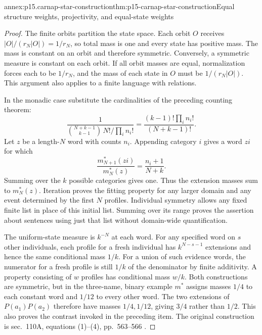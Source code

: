 \begin{annexitem}{annex:p15.carnap-star-construction}{thm:p15-carnap-star-construction}{Equal structure weights, projectivity, and equal-state weights}
\begin{proof}
The finite orbits partition the state space. Each orbit \(O\) receives
\(|O|/(r_N|O|)=1/r_N\), so total mass is one and every state has
positive mass. The mass is constant on an orbit and therefore symmetric.
Conversely, a symmetric measure is constant on each orbit. If all orbit
masses are equal, normalization forces each to be \(1/r_N\), and
the mass of each state in \(O\) must be \(1/(r_N|O|)\).
This argument also applies to a finite language with relations.

In the monadic case substitute the cardinalities of the preceding
counting theorem:
\[
 \frac1{\binom{N+k-1}{k-1}\,N!/\prod_i n_i!}
 =\frac{(k-1)!\prod_i n_i!}{(N+k-1)!}.
\]
Let \(z\) be a length-\(N\) word with counts \(n_i\).
Appending category \(i\) gives a word \(zi\) for which
\[
 \frac{m_{N+1}^*(zi)}{m_N^*(z)}=\frac{n_i+1}{N+k}.
\]
Summing over the \(k\) possible categories gives one. Thus the
extension masses sum to \(m_N^*(z)\). Iteration proves the fitting
property for any larger domain and any event determined by the first
\(N\) profiles. Individual symmetry allows any fixed finite list in
place of this initial list. Summing over its range proves the assertion
about sentences using just that list without domain-wide quantification.

The uniform-state measure is \(k^{-N}\) at each word. For any
specified word on \(s\) other individuals, each profile for a fresh
individual has \(k^{N-s-1}\) extensions and hence the same conditional
mass \(1/k\). For a union of such evidence words, the numerator for
a fresh profile is still \(1/k\) of the denominator by finite
additivity. A property consisting of \(w\) profiles has conditional
mass \(w/k\). Both constructions are symmetric, but in the three-name,
binary example \(m^*\) assigns masses \(1/4\) to each constant
word and \(1/12\) to every other word. The two extensions of
\(P(a_1)P(a_2)\) therefore have masses \(1/4,1/12\), giving
\(3/4\) rather than \(1/2\). This also proves the contrast invoked
in the preceding item. The original construction is sec.~110A,
equations (1)--(4), pp.~563--566 \cite{Carnap1950Probability}.
\end{proof}
\end{annexitem}


